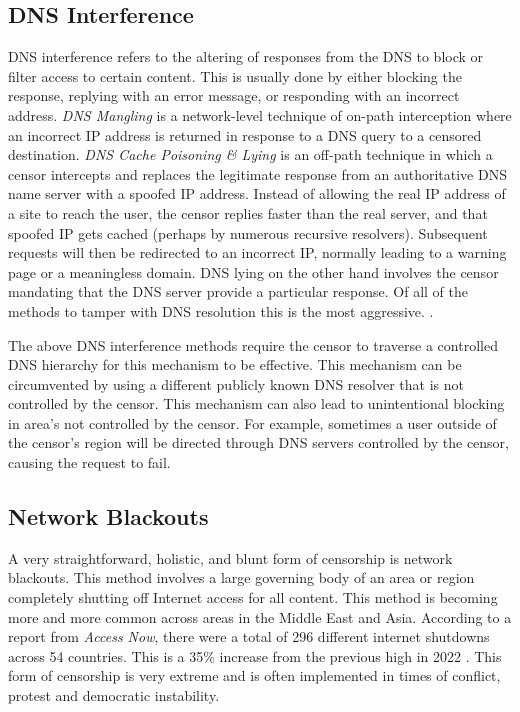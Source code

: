 \subsection{DNS Interference}
DNS interference refers to the altering of responses from the DNS to block or filter access to certain content. This is usually done by either blocking the response, replying with an error message, or responding with an incorrect address. 
\textit{DNS Mangling} is a network-level technique of on-path interception where an incorrect IP address is returned in response to a DNS query to a censored destination. 
\textit{DNS Cache Poisoning \& Lying} is an off-path technique in which a censor intercepts and replaces the legitimate response from an authoritative DNS name server with a spoofed IP address. Instead of allowing the real IP address of a site to reach the user, the censor replies faster than the real server, and that spoofed IP gets cached (perhaps by numerous recursive resolvers). Subsequent requests will then be redirected to an incorrect IP, normally leading to a warning page or a meaningless domain. DNS lying on the other hand involves the censor mandating that the DNS server provide a particular response. Of all of the methods to tamper with DNS resolution this is the most aggressive. \cite{rfc9505}.

The above DNS interference methods require the censor to traverse a controlled DNS hierarchy for this mechanism to be effective. This mechanism can be circumvented by using a different publicly known DNS resolver that is not controlled by the censor. This mechanism can also lead to unintentional blocking in area's not controlled by the censor. For example, sometimes a user outside of the censor's region will be directed through DNS servers controlled by the censor, causing the request to fail. 

\subsection{Network Blackouts}
A very straightforward, holistic, and blunt form of censorship is network blackouts. This method involves a large governing body of an area or region completely shutting off Internet access for all content. This method is becoming more and more common across areas in the Middle East and Asia. According to a report from \textit{Access Now}, there were a total of 296 different internet shutdowns across 54 countries. \cite{accessnowBlackoutReport2023} This is a 35\% increase from the previous high in 2022 \cite{internetblackouts}. This form of censorship is very extreme and is often implemented in times of conflict, protest and democratic instability. 


